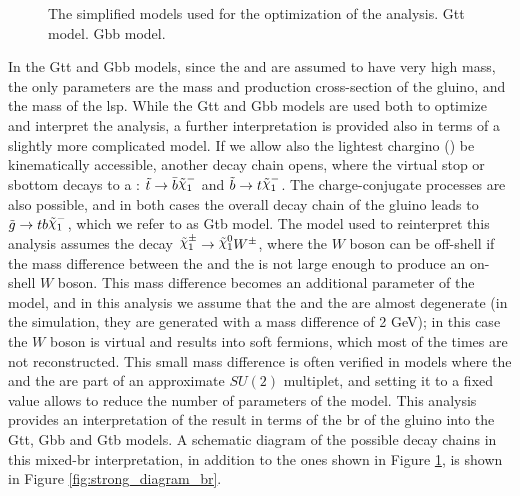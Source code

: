 \begin{figure}[h]
\centering 
{}
\caption{The simplified models used for the optimization of the analysis.  Gtt model.  Gbb model.
}\label{fig:strong_diagram}
\end{figure}

In the Gtt and Gbb models, since the \stop and \sbottom are assumed to have very high mass, the only parameters are the mass and production cross-section of the gluino, and the mass of the \gls{lsp}. While the Gtt and Gbb models are used both to optimize and interpret the analysis, a further interpretation is provided also in terms of a slightly more complicated model. If we allow also the lightest chargino (\chinoonepm) be kinematically accessible, another decay chain opens, where the virtual stop or sbottom decays to a \chinoonepm:
$\stop \to \bar{b} \chinoonem$ and 
$\sbottom \to t \chinoonem$.
The charge-conjugate processes are also possible, and in both cases the overall decay chain of the gluino leads to $\gluino \to t b \chinoonem$, which we refer to as Gtb model.
The model used to reinterpret this analysis assumes the decay $\chinoonepm \to \ninoone W^{\pm}$, where the $W$ boson can be off-shell if the mass difference between the \chinoonepm and the \ninoone is not large enough to produce an on-shell $W$ boson. 
This mass difference becomes an additional parameter of the model, and in this analysis we assume that the \chinoonepm and the \ninoone 
are almost degenerate (in the simulation, they are generated with a mass difference of 2 GeV); in this case the $W$ boson is virtual and results into soft fermions, which most of the times are not reconstructed. This small mass difference is often verified in models where the \chinoonepm and the \ninoone are part of an approximate $SU(2)$ multiplet, and setting it to a fixed value allows to reduce the number of parameters of the model. 
This analysis provides an interpretation of the result in terms of the \gls{br} of the gluino into the Gtt, Gbb and Gtb models. 
A schematic diagram of the possible decay chains in this mixed-\gls{br} interpretation, in addition to the ones shown in Figure \ref{fig:strong_diagram}, is shown in Figure \ref{fig:strong_diagram_br}.

